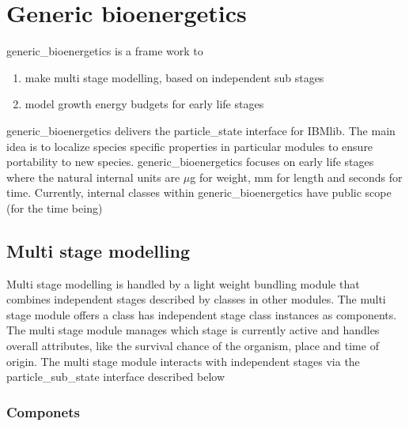 
\section{Generic bioenergetics} 

generic\_bioenergetics is a frame work to 
\begin{enumerate}
  \item make multi stage modelling, based on independent sub stages
  \item model growth energy budgets for early life stages
\end{enumerate} 
generic\_bioenergetics delivers the particle\_state interface for IBMlib.
The main idea is to localize species specific properties in particular modules
to ensure portability to new species.
generic\_bioenergetics focuses on early life stages where the natural internal units 
are $\mu$g for weight, mm for length and seconds for time.
Currently, internal classes within generic\_bioenergetics have public scope (for the time being)

\subsection{Multi stage modelling} 

Multi stage modelling is handled by a light weight bundling module that 
combines independent stages described by classes in other modules. The multi stage module
offers a class has independent stage class instances as components. The multi stage module
manages which stage is currently active and handles overall attributes, like the survival chance
of the organism, place and time of origin. The multi stage module interacts with independent stages
via the particle\_sub\_state interface described below

\subsubsection{Componets} 

